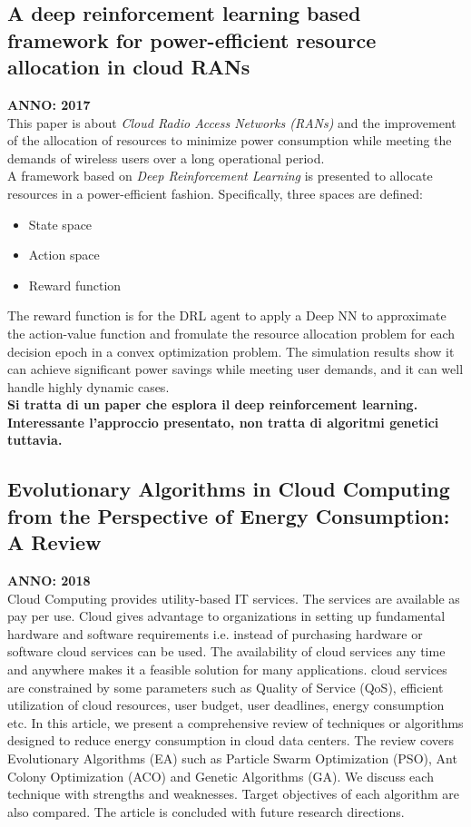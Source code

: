 \subsection{A deep reinforcement learning based framework for power-efficient resource allocation in cloud RANs}
\textbf{ANNO: 2017}~\cite{7997286}\\
This paper is about \textit{Cloud Radio Access Networks (RANs)} and the improvement of the allocation of resources
to minimize power consumption while meeting the demands of wireless users over a long operational period.  \\
A framework based on \textit{Deep Reinforcement Learning} is presented to allocate resources in a power-efficient fashion.
Specifically, three spaces are defined: 
\begin{itemize}
\item State space
\item Action space
\item Reward function
\end{itemize}

The reward function is for the DRL agent to apply a Deep NN to approximate the action-value function
and fromulate the resource allocation problem for each decision epoch in a convex optimization problem. 
The simulation results show it can achieve significant power savings while meeting user
demands, and it can well handle highly dynamic cases. \\

\textbf{Si tratta di un paper che esplora il deep reinforcement learning. 
Interessante l'approccio presentato, non tratta di algoritmi genetici tuttavia.}


\subsection{Evolutionary Algorithms in Cloud Computing from the Perspective of Energy Consumption: A Review}
\textbf{ANNO: 2018}~\cite{8603582}\\

Cloud Computing provides utility-based IT services. The services are available as pay per use. 
Cloud gives advantage to organizations in setting up fundamental hardware and software requirements i.e. instead of purchasing hardware or software cloud services can be used. 
The availability of cloud services any time and anywhere makes it a feasible solution for many applications. 
cloud services are constrained by some parameters such as Quality of Service (QoS), efficient utilization of cloud resources, user budget, user deadlines, energy consumption etc. 
In this article, we present a comprehensive review of techniques or algorithms designed to reduce energy consumption in cloud data centers. 
The review covers Evolutionary Algorithms (EA) such as Particle Swarm Optimization (PSO), Ant Colony Optimization (ACO) and Genetic Algorithms (GA). 
We discuss each technique with strengths and weaknesses. Target objectives of each algorithm are also compared. The article is concluded with future research directions.\\

